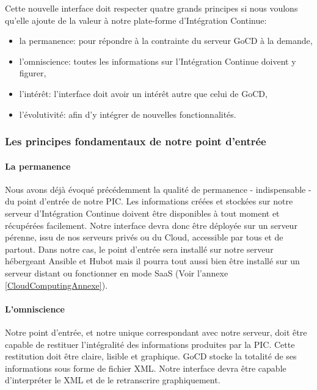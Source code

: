       Cette nouvelle interface doit respecter quatre grands principes si nous voulons qu'elle ajoute de la valeur à notre plate-forme d'Intégration Continue:\\

      \begin{itemize}
        \item la permanence: pour répondre à la contrainte du serveur GoCD à la demande,
        \item l'omniscience: toutes les informations sur l'Intégration Continue doivent y figurer,
        \item l'intérêt: l'interface doit avoir un intérêt autre que celui de GoCD,
        \item l'évolutivité: afin d'y intégrer de nouvelles fonctionnalités.\\
      \end{itemize}

        \subsubsection{Les principes fondamentaux de notre point d'entrée}
          \paragraph{La permanence} Nous avons déjà évoqué précédemment la qualité de permanence - indispensable - du point d'entrée de notre PIC. Les informations créées et stockées sur notre serveur d'Intégration Continue doivent être disponibles à tout moment et récupérées facilement. Notre interface devra donc être déployée sur un serveur pérenne, issu de nos serveurs privés ou du Cloud, accessible par tous et de partout.
          Dans notre cas, le point d'entrée sera installé sur notre serveur hébergeant Ansible et Hubot mais il pourra tout aussi bien être installé sur un serveur distant ou fonctionner en mode SaaS (Voir l'annexe \ref{CloudComputingAnnexe}).

          \paragraph{L'omniscience} Notre point d'entrée, et notre unique correspondant avec notre serveur, doit être capable de restituer l'intégralité des informations produites par la PIC. Cette restitution doit être claire, lisible et graphique.
          GoCD stocke la totalité de ses informations sous forme de fichier XML. Notre interface devra être capable d'interpréter le XML et de le retranscrire graphiquement.

